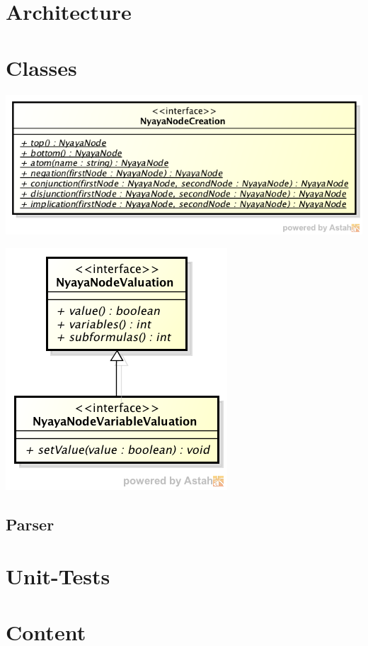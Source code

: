 
\section{Architecture}

\section{Classes}



\includegraphics[scale=0.65, trim=0 0.7cm 0 0, clip=true]{uml/NyayaNode/Creation.png}

\includegraphics[scale=0.65, trim=0 0.7cm 0 0, clip=true]{uml/NyayaNode/Valuation.png}

\subsection{Parser}
\cite{Louden:1997:CCP:523017}

\section{Unit-Tests}

\section{Content}



